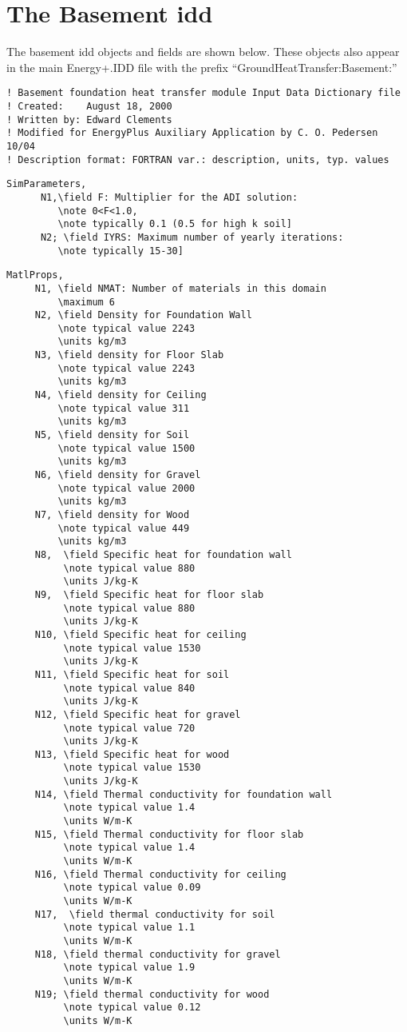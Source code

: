 \section{The Basement idd}\label{the-basement-idd}

The basement idd objects and fields are shown below. These objects also appear in the main Energy+.IDD file with the prefix ``GroundHeatTransfer:Basement:''

\begin{lstlisting}
! Basement foundation heat transfer module Input Data Dictionary file
! Created:    August 18, 2000
! Written by: Edward Clements
! Modified for EnergyPlus Auxiliary Application by C. O. Pedersen 10/04
! Description format: FORTRAN var.: description, units, typ. values
\end{lstlisting}

\begin{lstlisting}
SimParameters,
      N1,\field F: Multiplier for the ADI solution:
         \note 0<F<1.0,
         \note typically 0.1 (0.5 for high k soil]
      N2; \field IYRS: Maximum number of yearly iterations:
         \note typically 15-30]
\end{lstlisting}

\begin{lstlisting}
MatlProps,
     N1, \field NMAT: Number of materials in this domain
         \maximum 6
     N2, \field Density for Foundation Wall
         \note typical value 2243
         \units kg/m3
     N3, \field density for Floor Slab
         \note typical value 2243
         \units kg/m3
     N4, \field density for Ceiling
         \note typical value 311
         \units kg/m3
     N5, \field density for Soil
         \note typical value 1500
         \units kg/m3
     N6, \field density for Gravel
         \note typical value 2000
         \units kg/m3
     N7, \field density for Wood
         \note typical value 449
         \units kg/m3
     N8,  \field Specific heat for foundation wall
          \note typical value 880
          \units J/kg-K
     N9,  \field Specific heat for floor slab
          \note typical value 880
          \units J/kg-K
     N10, \field Specific heat for ceiling
          \note typical value 1530
          \units J/kg-K
     N11, \field Specific heat for soil
          \note typical value 840
          \units J/kg-K
     N12, \field Specific heat for gravel
          \note typical value 720
          \units J/kg-K
     N13, \field Specific heat for wood
          \note typical value 1530
          \units J/kg-K
     N14, \field Thermal conductivity for foundation wall
          \note typical value 1.4
          \units W/m-K
     N15, \field Thermal conductivity for floor slab
          \note typical value 1.4
          \units W/m-K
     N16, \field Thermal conductivity for ceiling
          \note typical value 0.09
          \units W/m-K
     N17,  \field thermal conductivity for soil
          \note typical value 1.1
          \units W/m-K
     N18, \field thermal conductivity for gravel
          \note typical value 1.9
          \units W/m-K
     N19; \field thermal conductivity for wood
          \note typical value 0.12
          \units W/m-K
\end{lstlisting}

